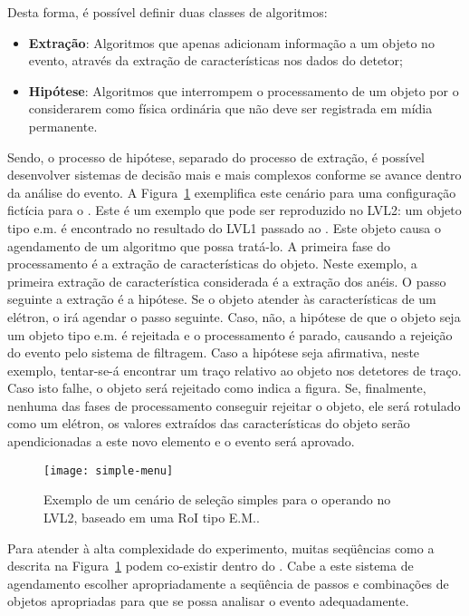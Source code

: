 Desta forma, é possível definir duas classes de algoritmos:

\begin{itemize}
\item \textbf{Extração}: Algoritmos que apenas adicionam informação a um
objeto no evento, através da extração de características nos dados do detetor;
\item \textbf{Hipótese}: Algoritmos que interrompem o processamento de um
objeto por o considerarem como física ordinária que não deve ser registrada em
mídia permanente.
\end{itemize}

Sendo, o processo de hipótese, separado do processo de extração, é possível
desenvolver sistemas de decisão mais e mais complexos conforme se avance
dentro da análise do evento. A Figura~\ref{fig:simple-menu} exemplifica este
cenário para uma configuração fictícia para o . Este é um
exemplo que pode ser reproduzido no LVL2: um objeto tipo e.m. é encontrado no
resultado do LVL1 passado ao . Este objeto causa o agendamento
de um algoritmo que possa tratá-lo. A primeira fase do processamento é a
extração de características do objeto. Neste exemplo, a primeira extração de
característica considerada é a extração dos anéis. O passo seguinte a extração
é a hipótese. Se o objeto atender às características de um elétron, o
 irá agendar o passo seguinte. Caso, não, a hipótese de que o
objeto seja um objeto tipo e.m. é rejeitada e o processamento é parado,
causando a rejeição do evento pelo sistema de filtragem. Caso a hipótese seja
afirmativa, neste exemplo, tentar-se-á encontrar um traço relativo ao objeto
nos detetores de traço. Caso isto falhe, o objeto será rejeitado como indica a
figura. Se, finalmente, nenhuma das fases de processamento conseguir rejeitar
o objeto, ele será rotulado como um elétron, os valores extraídos das
características do objeto serão apendicionadas a este novo elemento e o evento
será aprovado.

\begin{figure}
\begin{center}
\texttt{[image: simple-menu]}
\end{center}
\caption{Exemplo de um cenário de seleção simples para o 
operando no LVL2, baseado em uma RoI tipo E.M..}
\label{fig:simple-menu}
\end{figure}

Para atender à alta complexidade do experimento, muitas seqüências como a
descrita na Figura~\ref{fig:simple-menu} podem co-existir dentro do
. Cabe a este sistema de agendamento escolher apropriadamente
a seqüência de passos e combinações de objetos apropriadas para que se possa
analisar o evento adequadamente.

